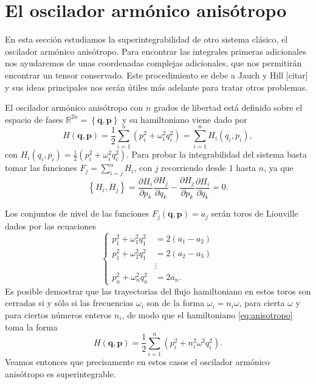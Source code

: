 \documentclass[12pt,a4paper,twocolumn,reqno]{amsart}
\theoremstyle{definition} \newtheorem{defn}[thm]{Definición}
\theoremstyle{definition} \newtheorem{ejemplo}[thm]{Ejemplo}
\theoremstyle{definition} \newtheorem{ejercicio}[thm]{Ejercicio}
\theoremstyle{remark} \newtheorem*{obs}{Observación}
\def\RR{\mathbb{R}}
\newcommand{\vect}[1]{\mathbf{#1}}
\newcommand{\parcial}[2]{\frac{\partial #1}{\partial #2}}
\begin{document}
\section{El oscilador armónico anisótropo}
En esta sección estudiamos la superintegrabilidad de otro sistema clásico, el oscilador armónico anisótropo. Para encontrar las integrales primeras adicionales nos ayudaremos de unas coordenadas complejas adicionales, que nos permitirán encontrar un tensor conservado. Este procedimiento se debe a Jauch y Hill [citar] y sus ideas principales nos serán útiles más adelante para tratar otros problemas.

El oscilador armónico anisótropo con $n$ grados de libertad está definido sobre el espacio de fases $\RR^{2n}=\left\{ \vect{q},\vect{p} \right\}$ y su hamiltoniano viene dado por
\begin{equation}
  H(\vect{q},\vect{p})=\frac{1}{2}\sum_{i=1}^n \left(p_i^2 + \omega_i^2q_i^2\right)=\sum_{i=1}^n H_i(q_i,p_i),
  \label{eq:anisotropo}
\end{equation}
con $H_i(q_i,p_i)=\frac{1}{2}(p_i^2+\omega_i^2q_i^2)$. Para probar la integrabilidad del sistema basta tomar las funciones $F_j=\sum_{i=j}^n H_i$, con $j$ recorriendo desde $1$ hasta $n$, ya que
\begin{equation*}
  \left\{ H_i,H_j \right\}=\parcial{H_i}{p_k}\parcial{H_j}{q_k}-\parcial{H_j}{p_k}\parcial{H_i}{q_k}=0.
\end{equation*}

Los conjuntos de nivel de las funciones $F_j(\vect{q},\vect{p})=a_j$ serán toros de Liouville dados por las ecuaciones
\begin{equation*}
  \begin{cases}
    p_1^2+\omega_1^2q_1^2&= 2(a_1-a_2)\\
    p_1^2+\omega_2^2q_1^2&= 2(a_2-a_3)\\
     &\vdots \\
    p_n^2+\omega_n^2q_n^2&= 2a_n.
  \end{cases}
\end{equation*}
Es posible demostrar que las trayectorias del flujo hamiltoniano en estos toros son cerradas si y sólo si las frecuencias $\omega_i$ son de la forma $\omega_i=n_i \omega$, para cierta $\omega$ y para ciertos números enteros $n_i$, de modo que el hamiltoniano \eqref{eq:anisotropo} toma la forma
\begin{equation}
  H(\vect{q},\vect{p})=\frac{1}{2}\sum_{i=1}^n \left(p_i^2 + n_i^2\omega^2q_i^2\right).
\end{equation}
Veamos entonces que precisamente en estos casos el oscilador armónico anisótropo es superintegrable.
\end{document}
